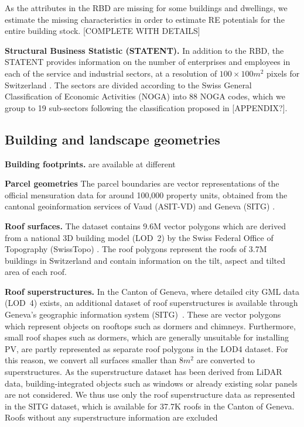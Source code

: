 As the attributes in the RBD are missing for some buildings and dwellings, we estimate the missing characteristics in order to estimate RE potentials for the entire building stock. [COMPLETE WITH DETAILS]

\textbf{Structural Business Statistic (STATENT).} In addition to the RBD, the STATENT provides information on the number of enterprises and employees in each of the service and industrial sectors, at a resolution of $100 \times 100 m^2$ pixels for Switzerland \cite{bfs_statistik_2018}. The sectors are divided according to the Swiss General Classification of Economic Activities (NOGA) into 88 NOGA codes, which we group to 19 sub-sectors following the classification proposed in \cite{bfe_energieverbrauch_2019} [APPENDIX?].

\subsection{Building and landscape geometries}

\textbf{Building footprints.} are available at different 

\textbf{Parcel geometries}
The parcel boundaries are vector representations of the official mensuration data for around 100,000 property units, obtained from the cantonal geoinformation services of Vaud (ASIT-VD) \cite{asit_vd_cadastre_2019} and Geneva (SITG) \cite{sitg_parcelles_2020}.

\textbf{Roof surfaces.}
The dataset contains 9.6M vector polygons which are derived from a national 3D building model (LOD~2) by the Swiss Federal Office of Topography (SwissTopo) \cite{klauser_solarpotentialanalyse_2016}.
The roof polygons represent the roofs of 3.7M buildings in Switzerland and contain information  on the tilt, aspect and tilted area of each roof.

\textbf{Roof superstructures.}
In the Canton of Geneva, where detailed city GML data (LOD~4) exists, an additional dataset of roof superstructures is available through Geneva's geographic information system (SITG)~\cite{sitg_superstructures_2019}. %
These are vector polygons which represent objects on rooftops such as dormers and chimneys. 
Furthermore, small roof shapes such as dormers, which are generally unsuitable for installing PV, are partly represented as separate roof polygons in the LOD4 dataset.
For this reason, we convert all surfaces smaller than $8m^2$ are converted to superstructures. 
As the superstructure dataset has been derived from LiDAR data, building-integrated objects such as windows or already existing solar panels are not considered. We thus use only the roof superstructure data as represented in the SITG dataset, which is available for 37.7K roofs in the Canton of Geneva. Roofs without any superstructure information are excluded 

